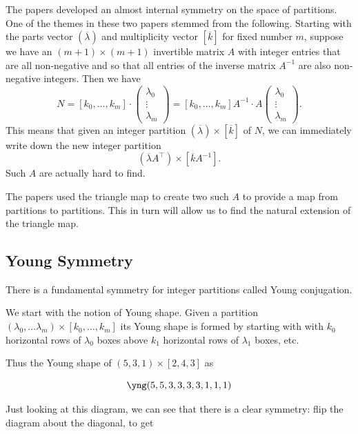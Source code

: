 \documentclass[12pt,oneside,openany]{article}
\begin{document}
The papers  \cite{BBDGI, BG} developed an almost internal symmetry on the space of partitions.  One of the themes in these two papers stemmed from the following.  Starting with  the parts vector $(\overline{\lambda})$ and multiplicity vector $[\overline{k}] $ for  fixed number $m$, suppose we have an $(m+1) \times (m+1)$ invertible matrix $A$ with integer entries that are all non-negative and so that all entries of the inverse matrix $A^{-1}$ are also non-negative integers.  Then we have 
$$N=[k_0, \ldots, k_m] \cdot \left(  \begin{array}{c} \lambda_0 \\ \vdots \\ \lambda_m \end{array} \right)  = [k_0, \ldots, k_m] A^{-1} \cdot A \left(  \begin{array}{c} \lambda_0 \\ \vdots \\ \lambda_m \end{array} \right).  $$
This means that given an integer partition $ (\overline{\lambda}) \times [ \overline{k}] $ of $N$, we can immediately write down the new integer partition 
$$(\overline{\lambda}A^{\top}) \times [ \overline{k}A^{-1}] .$$
Such $A$ are actually hard to find.

The papers  \cite{BBDGI, BG} used the triangle map to create two such $A$ to provide a map from partitions to partitions.  This in turn will allow us to find the natural extension of the triangle map.


\iffalse
\subsection{Young Symmetry}\label{young symmetry}

There is a fundamental symmetry for integer partitions called Young conjugation.

We start with the notion of Young shape.  Given a partition  $(\lambda_0, \ldots \lambda_m) \times [k_0, \ldots , k_m]$
 its Young shape is formed by starting with 
with $k_0$ horizontal  rows of  $\lambda_0$ boxes above $k_1$ horizontal  rows of  $\lambda_1$ boxes, etc.

Thus the Young shape of 
$(5,3, 1) \times [2, 4, 3]$ as 

   
 \[
        \yng(5,5,3,3,3,3,1,1,1)
    \]

Just looking at this diagram, we can see that there is a clear symmetry: flip the diagram about the diagonal, to get 
\end{document}
